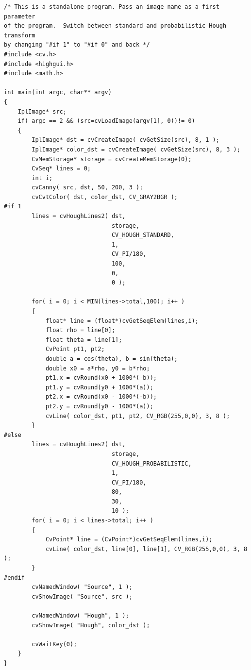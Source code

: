 \begin{lstlisting}
/* This is a standalone program. Pass an image name as a first parameter
of the program.  Switch between standard and probabilistic Hough transform
by changing "#if 1" to "#if 0" and back */
#include <cv.h>
#include <highgui.h>
#include <math.h>

int main(int argc, char** argv)
{
    IplImage* src;
    if( argc == 2 && (src=cvLoadImage(argv[1], 0))!= 0)
    {
        IplImage* dst = cvCreateImage( cvGetSize(src), 8, 1 );
        IplImage* color_dst = cvCreateImage( cvGetSize(src), 8, 3 );
        CvMemStorage* storage = cvCreateMemStorage(0);
        CvSeq* lines = 0;
        int i;
        cvCanny( src, dst, 50, 200, 3 );
        cvCvtColor( dst, color_dst, CV_GRAY2BGR );
#if 1
        lines = cvHoughLines2( dst,
                               storage,
                               CV_HOUGH_STANDARD,
                               1,
                               CV_PI/180,
                               100,
                               0,
                               0 );

        for( i = 0; i < MIN(lines->total,100); i++ )
        {
            float* line = (float*)cvGetSeqElem(lines,i);
            float rho = line[0];
            float theta = line[1];
            CvPoint pt1, pt2;
            double a = cos(theta), b = sin(theta);
            double x0 = a*rho, y0 = b*rho;
            pt1.x = cvRound(x0 + 1000*(-b));
            pt1.y = cvRound(y0 + 1000*(a));
            pt2.x = cvRound(x0 - 1000*(-b));
            pt2.y = cvRound(y0 - 1000*(a));
            cvLine( color_dst, pt1, pt2, CV_RGB(255,0,0), 3, 8 );
        }
#else
        lines = cvHoughLines2( dst,
                               storage,
                               CV_HOUGH_PROBABILISTIC,
                               1,
                               CV_PI/180,
                               80,
                               30,
                               10 );
        for( i = 0; i < lines->total; i++ )
        {
            CvPoint* line = (CvPoint*)cvGetSeqElem(lines,i);
            cvLine( color_dst, line[0], line[1], CV_RGB(255,0,0), 3, 8 );
        }
#endif
        cvNamedWindow( "Source", 1 );
        cvShowImage( "Source", src );

        cvNamedWindow( "Hough", 1 );
        cvShowImage( "Hough", color_dst );

        cvWaitKey(0);
    }
}
\end{lstlisting}

